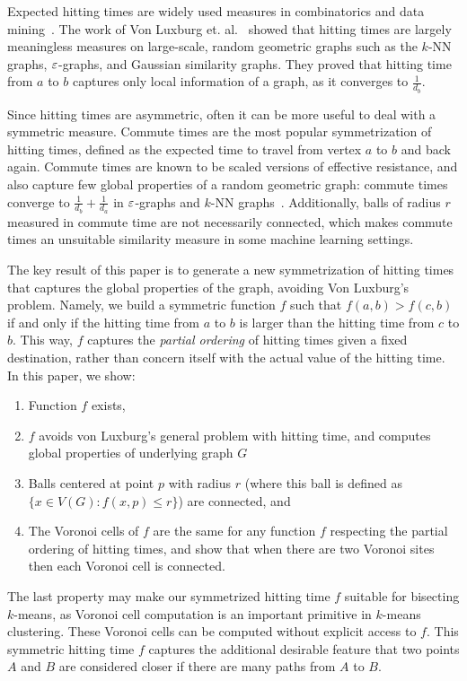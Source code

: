 Expected hitting times are widely used measures in combinatorics and data
mining~\cite{Chen08}. The work of Von Luxburg et.
al.~\cite{VL14} showed that hitting times are largely meaningless
measures on large-scale, random geometric graphs such as the
$k$-NN graphs, $\varepsilon$-graphs, and Gaussian similarity graphs.
They proved that hitting time from $a$ to
$b$ captures only local information of a
graph, as it converges to $\frac{1}{d_b}$.

Since hitting times are asymmetric, often it can be more useful
to deal with a symmetric measure.
Commute times are the most popular symmetrization of hitting
times, defined as the expected time to travel from vertex $a$ to
$b$ and back again. Commute times are known to be scaled
versions of effective resistance, and also capture few global
properties of a random geometric graph: commute times converge to
$\frac{1}{d_b} + \frac{1}{d_a}$ in $\varepsilon$-graphs and $k$-NN
graphs~\cite{VL14}. Additionally, balls of radius $r$ measured in
commute time are not necessarily connected, which makes commute
times an unsuitable similarity measure in some machine learning
settings.

The key result of this paper is to generate a new symmetrization
of
hitting times that captures the global properties of the
graph, avoiding Von Luxburg's problem. 
Namely, we build a symmetric
function $f$ such that $f(a,b) > f(c,b)$ if and only if the
hitting time from $a$ to $b$ is larger than the hitting time from
$c$ to $b$. This way, $f$ captures the \textit{partial ordering}
of hitting times given a fixed destination, rather than concern
itself with the actual value of the hitting time. In this paper,
       we show:
\begin{enumerate}
\item Function $f$ exists,
\item $f$ avoids von Luxburg's general problem with hitting
time, and computes global properties of underlying graph $G$
\item Balls centered at point $p$ with radius
$r$
(where this ball is defined as $\{x \in V(G): f(x, p) \leq r\}$) are connected, and
\item  The Voronoi cells of $f$ are the same for any
function $f$ respecting the partial ordering of hitting times,
         and show that when there are two Voronoi sites then each
         Voronoi cell is connected.
\end{enumerate}
The last property may make our symmetrized hitting time $f$
suitable for bisecting $k$-means, as Voronoi cell computation is
an important primitive in $k$-means clustering. These Voronoi cells can be
computed without explicit access to $f$.  
This symmetric hitting time $f$
captures the additional desirable feature that two points $A$ and
$B$ are considered closer if there are many paths from $A$ to
$B$.


